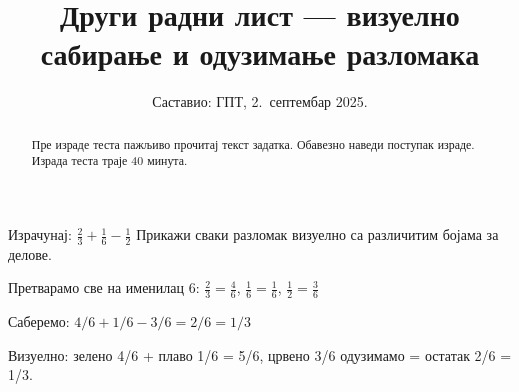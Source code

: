 \documentclass[11pt,a5paper,addpoints]{exam}
\title{Други радни лист — визуелно сабирање и одузимање разломака}
\author{Саставио: ГПТ, 2.\ септембар 2025.}
\date{}
\begin{document}
\maketitle
\thispagestyle{headandfoot}

\begin{abstract}
Пре израде теста пажљиво прочитај текст задатка.
Обавезно наведи поступак израде.
Израда теста траје 40 минута.
\end{abstract}

\noindent \gradetable[h]

\begin{questions}

\question[4]
Израчунај: $\frac{2}{3}+\frac{1}{6}-\frac{1}{2}$  
Прикажи сваки разломак визуелно са различитим бојама за делове.

\begin{center}

\vspace{0.3cm}


\vspace{0.3cm}

\end{center}

\begin{solution}[\stretch 2]
Претварамо све на именилац 6:  
$\frac{2}{3} = \frac{4}{6}$, $\frac{1}{6} = \frac{1}{6}$, $\frac{1}{2} = \frac{3}{6}$  

Саберемо: $4/6 + 1/6 - 3/6 = 2/6 = 1/3$  

Визуелно: зелено 4/6 + плаво 1/6 = 5/6, црвено 3/6 одузимамо = остатак 2/6 = 1/3.
\end{solution}


\end{questions}
\end{document}

